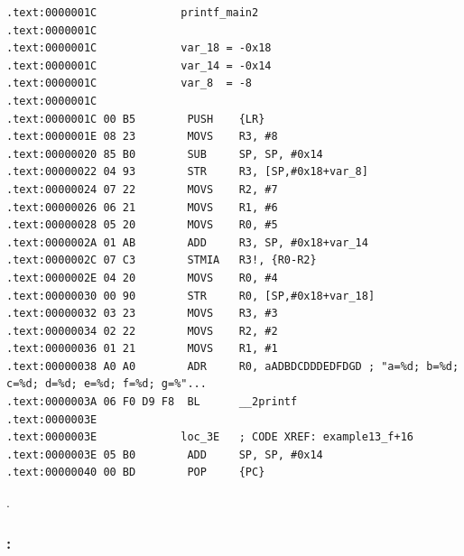\begin{lstlisting}
.text:0000001C             printf_main2
.text:0000001C
.text:0000001C             var_18 = -0x18
.text:0000001C             var_14 = -0x14
.text:0000001C             var_8  = -8
.text:0000001C
.text:0000001C 00 B5        PUSH    {LR}
.text:0000001E 08 23        MOVS    R3, #8
.text:00000020 85 B0        SUB     SP, SP, #0x14
.text:00000022 04 93        STR     R3, [SP,#0x18+var_8]
.text:00000024 07 22        MOVS    R2, #7
.text:00000026 06 21        MOVS    R1, #6
.text:00000028 05 20        MOVS    R0, #5
.text:0000002A 01 AB        ADD     R3, SP, #0x18+var_14
.text:0000002C 07 C3        STMIA   R3!, {R0-R2}
.text:0000002E 04 20        MOVS    R0, #4
.text:00000030 00 90        STR     R0, [SP,#0x18+var_18]
.text:00000032 03 23        MOVS    R3, #3
.text:00000034 02 22        MOVS    R2, #2
.text:00000036 01 21        MOVS    R1, #1
.text:00000038 A0 A0        ADR     R0, aADBDCDDDEDFDGD ; "a=%d; b=%d; c=%d; d=%d; e=%d; f=%d; g=%"...
.text:0000003A 06 F0 D9 F8  BL      __2printf
.text:0000003E
.text:0000003E             loc_3E   ; CODE XREF: example13_f+16
.text:0000003E 05 B0        ADD     SP, SP, #0x14
.text:00000040 00 BD        POP     {PC}
\end{lstlisting}

.

\subsubsection{\OptimizingXcodeIV: \ARMMode}

